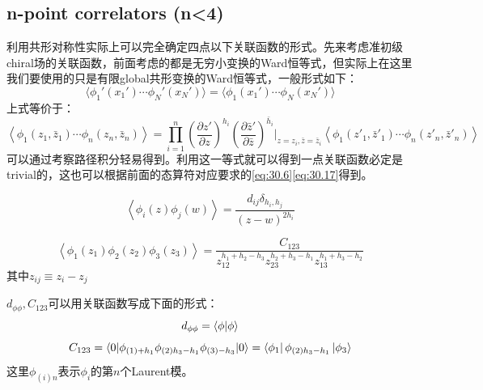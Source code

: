 \subsection{n-point correlators (n<4)}
利用共形对称性实际上可以完全确定四点以下关联函数的形式。先来考虑准初级chiral场的关联函数，前面考虑的都是无穷小变换的Ward恒等式，但实际上在这里我们要使用的只是有限global共形变换的Ward恒等式，一般形式如下：
\begin{equation}\label{global ward}
	\boxed{
	\langle\phi_1'(x_1')\cdots\phi_N'(x_N')\rangle=\langle\phi_1(x_1')\cdots\phi_N(x_N')\rangle
	}
\end{equation}
上式等价于：
\begin{equation}
	\left\langle\phi_{1}\left(z_{1},\bar{z}_{1}\right)\cdots\phi_{n}\left(z_{n},\bar{z}_{n}\right)\right\rangle=\prod_{i=1}^{n}\left(\frac{\partial z'}{\partial z}\right)^{h_{i}}\left(\frac{\partial\bar{z}'}{\partial\bar{z}}\right)^{\bar{h}_{i}}\Bigg|_{z=z_{i},\bar{z}=\bar{z}_{i}}\left\langle\phi_{1}\left(z'_{1},\bar{z}'_{1}\right)\cdots\phi_{n}\left(z'_{n},\bar{z}'_{n}\right)\right\rangle 
\end{equation}
可以通过考察路径积分轻易得到。利用这一等式就可以得到一点关联函数必定是trivial的，这也可以根据前面的态算符对应要求的\ref{eq:30.6}\ref{eq:30.17}得到。
\begin{theorem}[2-pt]
	\begin{equation}\label{31.19}
		\left\langle\phi_i(z)\phi_j(w)\right\rangle=\frac{d_{ij}\delta_{h_i,h_j}}{(z-w)^{2h_i}}
	\end{equation}
\end{theorem}
\begin{theorem}[3-pt]
	\begin{equation}\label{31.20}
		\left\langle\phi_1(z_1)\phi_2(z_2)\phi_3(z_3)\right\rangle=\frac{C_{123}}{z_{12}^{h_1+h_2-h_3}z_{23}^{h_2+h_3-h_1}z_{13}^{h_1+h_3-h_2}}
	\end{equation}
	其中$z_{ij}\equiv z_i-z_j$
\end{theorem}
\begin{remark}
	$d_{\phi\phi},C_{123}$可以用关联函数写成下面的形式：
	\begin{equation}
		d_{\phi\phi}=\braket{\phi}{\phi}
	\end{equation}
	\begin{equation}
		C_{123}=\langle0|\phi_{(1)+h_1}\phi_{(2)h_3-h_1}\phi_{(3)-h_3}|0\rangle =\bra{\phi_1}\phi_{(2)h_3-h_1}\ket{\phi_3}
	\end{equation}
	这里$\phi_{(i)n}$表示$\phi_i$的第$n$个Laurent模。
\end{remark}

